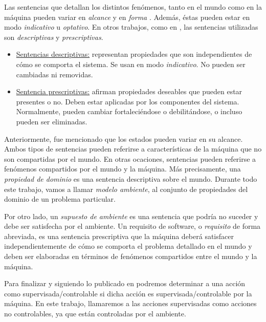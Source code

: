 Las sentencias que detallan los distintos fenómenos, tanto en el mundo como en la máquina pueden variar en
\emph{alcance} y en \emph{forma} \cite{Parnas95functionaldocuments,Jackson:1995:SRA:210207}. Además, éstas pueden estar en modo \emph{indicativo} u \emph{optativo}. En
otros trabajos, como en \cite{van2009requirements}, las sentencias utilizadas son \emph{descriptivas} y \emph{prescriptivas}.

\begin{itemize}
    \item \underline{Sentencias descriptivas:} representan propiedades que son independientes de cómo se comporta el
    sistema. Se usan en modo \emph{indicativo}. No pueden ser cambiadas ni removidas.
    \item \underline{Sentencia prescriptivas:} afirman propiedades deseables que pueden estar presentes o no. Deben estar
    aplicadas por los componentes del sistema. Normalmente, pueden cambiar fortaleciéndose o debilitándose, o incluso
    pueden ser eliminadas. 
\end{itemize}

Anteriormente, fue mencionado que los estados pueden variar en su alcance. Ambos tipos de sentencias pueden referirse a
características de la máquina que no son compartidas por el mundo. En otras ocaciones, sentencias pueden referirse a
fenómenos compartidos por el mundo y la máquina. Más precisamente, una \emph{propiedad de dominio} es
una sentencia descriptiva sobre el mundo. Durante todo este trabajo, vamos a llamar \emph{modelo ambiente}, al conjunto
de propiedades del dominio de un problema particular.

Por otro lado, un \emph{supuesto de ambiente} es una sentencia que podría no suceder y debe ser satisfecha por el
ambiente. Un requisito de software, o \emph{requisito} de forma abreviada, es una sentencia prescriptiva que la máquina
deberá satisfacer independientemente de cómo se comporta el problema detallado en el mundo y deben ser elaboradas en
términos de fenómenos compartidos entre el mundo y la máquina.

Para finalizar y siguiendo lo publicado en \cite{VanLamsweerde:2001:GRE:882477.883624, 879820} podremos determinar a una
acción como supervisada/controlable si dicha acción es supervisada/controlable por la máquina. En este trabajo,
llamaremos a las acciones supervisadas como acciones no controlables, ya que están controladas por el ambiente.
